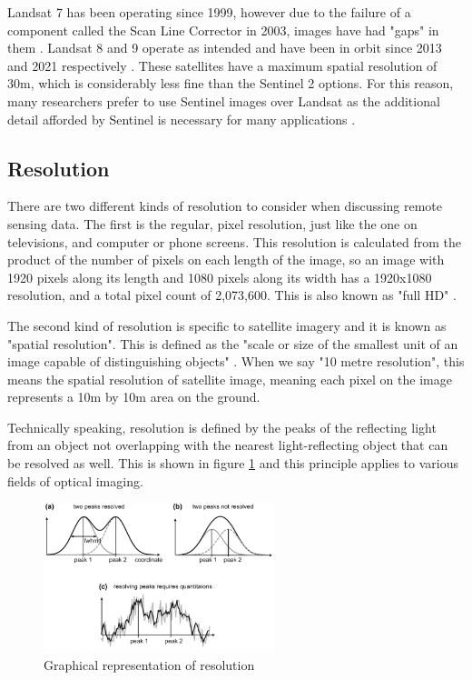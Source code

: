 Landsat 7 has been operating since 1999, however due to the failure of a component called the Scan Line Corrector in 2003, images have had "gaps" in them \citep{usgs_2024}. Landsat 8 and 9 operate as intended and have been in orbit since 2013 and 2021 respectively \citep{usgs_2023, usgs_2022}. These satellites have a maximum spatial resolution of 30m, which is considerably less fine than the Sentinel 2 options. For this reason, many researchers prefer to use Sentinel images over Landsat as the additional detail afforded by Sentinel is necessary for many applications \citep{ghansah_2022_monitoring, kirby_ferguson_rennie_cousineau_nistor_2024}. 

\subsection{Resolution}
There are two different kinds of resolution to consider when discussing remote sensing data. The first is the regular, pixel resolution, just like the one on televisions, and computer or phone screens. This resolution is calculated from the product of the number of pixels on each length of the image, so an image with 1920 pixels along its length and 1080 pixels along its width has a 1920x1080 resolution, and a total pixel count of 2,073,600. This is also known as "full HD" \citep{lenovo_2021}. 

The second kind of resolution is specific to satellite imagery and it is known as "spatial resolution". This is defined as the "scale or size of the smallest unit of an image capable of distinguishing objects" \citep{zhang_li_zhang_li_2023}. When we say "10 metre resolution", this means the spatial resolution of satellite image, meaning each pixel on the image represents a 10m by 10m area on the ground. 

Technically speaking, resolution is defined by the peaks of the reflecting light from an object not overlapping with the nearest light-reflecting object that can be resolved as well. This is shown in figure \ref{fig:LR resolution graph} and this principle applies to various fields of optical imaging. 

\begin{figure}[ht]
    \centering
    \includegraphics[width=0.6\textwidth]{contents/figures/LR resolution peaks.jpg}
    \caption{Graphical representation of resolution \citep{kudryashev_2018}}
    \label{fig:LR resolution graph}
\end{figure}

